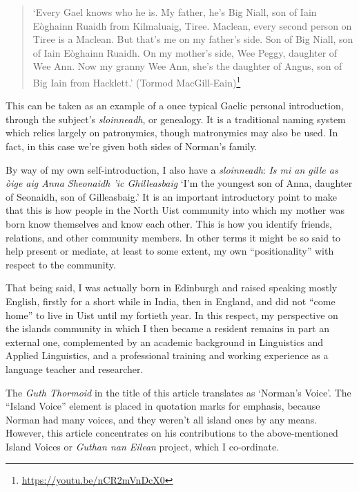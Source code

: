 \documentclass[output=paper,colorlinks,citecolor=brown]{langscibook}
\begin{document}
\begin{quote}
`Every Gael knows who he is. My father, he’s Big Niall, son of Iain Eòghainn Ruaidh from Kilmaluaig, Tiree. Maclean, every second person on Tiree is a Maclean. But that’s me on my father’s side. Son of Big Niall, son of Iain Eòghainn Ruaidh. On my mother’s side, Wee Peggy, daughter of Wee Ann. Now my granny Wee Ann, she’s the daughter of Angus, son of Big Iain from Hacklett.' (Tormod MacGill-Eain)\footnote{\url{https://youtu.be/nCR2mVnDcX0}} 
\end{quote}

This can be taken as an example of a once typical Gaelic personal introduction, through the subject’s \textit{sloinneadh}, or genealogy. It is a traditional naming system which relies largely on patronymics, though matronymics may also be used. In fact, in this case we’re given both sides of Norman’s family. 

By way of my own self-introduction, I also have a \textit{sloinneadh}: \textit{Is mi an gille as òige aig Anna Sheonaidh ’ic Ghilleasbaig} `I’m the youngest son of Anna, daughter of Seonaidh, son of Gilleasbaig.’ It is an important introductory point to make that this is how people in the North Uist community into which my mother was born know themselves and know each other. This is how you identify friends, relations, and other community members. In other terms it might be so said to help present or mediate, at least to some extent, my own ``positionality” \citep{gw:Greenbank2003} 
with respect to the community. 

That being said, I was actually born in Edinburgh and raised speaking mostly English, firstly for a short while in India, then in England, and did not ``come home” to live in Uist until my fortieth year. In this respect, my perspective on the islands community in which I then became a resident remains in part an external one, complemented by an academic background in Linguistics and Applied Linguistics, and a professional training and working experience as a language teacher and researcher. 

The \textit{Guth Thormoid} in the title of this article translates as `Norman’s Voice’. The “Island Voice” element is placed in quotation marks for emphasis, because Norman had many voices, and they weren’t all island ones by any means. However, this article concentrates on his contributions to the above-mentioned Island Voices or \textit{Guthan nan Eilean} project, which I co-ordinate.
\end{document}
